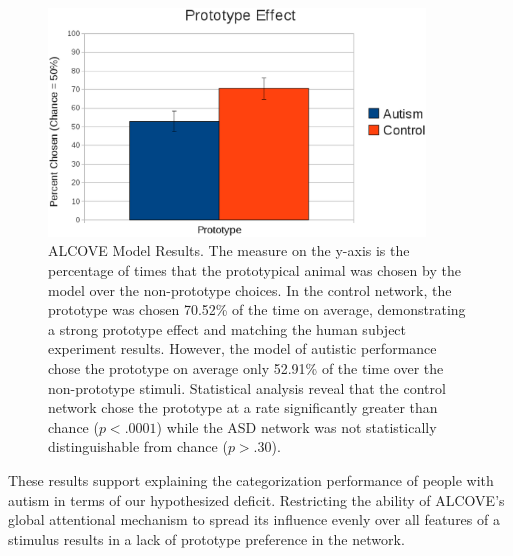 \begin{figure}[ht]
\begin{center}
	\includegraphics[width=100mm]{graphs/alcove_results.eps}
\end{center}
\caption{ALCOVE Model Results.  The measure on the y-axis is the percentage of times that the prototypical animal was chosen by the model over the non-prototype choices.  In the control network, the prototype was chosen 70.52\% of the time on average, demonstrating a strong prototype effect and matching the human subject experiment results.  However, the model of autistic performance chose the prototype on average only 52.91\% of the time over the non-prototype stimuli.  Statistical analysis reveal that the control network chose the prototype at a rate significantly greater than chance ($p < .0001$) while the ASD network was not statistically distinguishable from chance ($p > .30$).}
\label{alcove-results}
\end{figure} 

These results support explaining the categorization performance of people with autism in terms of our hypothesized deficit. Restricting the ability of ALCOVE's global attentional mechanism to spread its influence evenly over all features of a stimulus results in a lack of prototype preference in the network.     

